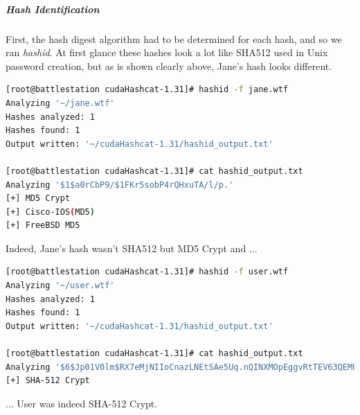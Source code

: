 \subparagraph{Hash Identification}
First, the hash digest algorithm had to be determined for each hash, and so we ran \textit{hashid}. At first glance these hashes look a lot like SHA512 used in Unix password creation, but as is shown clearly above, Jane's hash looks different.

\begin{lstlisting}[language=bash,caption={Identifying Jane}]
[root@battlestation cudaHashcat-1.31]# hashid -f jane.wtf
Analyzing '~/jane.wtf'
Hashes analyzed: 1
Hashes found: 1
Output written: '~/cudaHashcat-1.31/hashid_output.txt'

[root@battlestation cudaHashcat-1.31]# cat hashid_output.txt 
Analyzing '$1$a0rCbP9/$1FKr5sobP4rQHxuTA/l/p.'
[+] MD5 Crypt
[+] Cisco-IOS(MD5)
[+] FreeBSD MD5
\end{lstlisting}

Indeed, Jane's hash wasn't SHA512 but MD5 Crypt and ...

\begin{lstlisting}[language=bash,caption={Identifying User}]
[root@battlestation cudaHashcat-1.31]# hashid -f user.wtf
Analyzing '~/user.wtf'
Hashes analyzed: 1
Hashes found: 1
Output written: '~/cudaHashcat-1.31/hashid_output.txt'

[root@battlestation cudaHashcat-1.31]# cat hashid_output.txt 
Analyzing '$6$Jp01V0lm$RX7eMjNIIoCnazLNEtSAe5Uq.nQINXMOpEggvRtTEV63QEMUEpmwFMJhYzQtLT/M33Kbl5Mhr59tPJbvN/u4k1'
[+] SHA-512 Crypt
\end{lstlisting}

... User was indeed SHA-512 Crypt.




